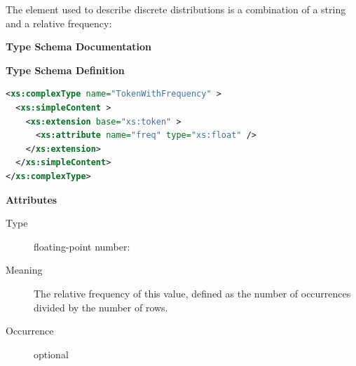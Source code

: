 \documentclass[11pt,a4paper]{ivoa}
\begin{document}
\begin{generated}
\begin{bigdescription}
\begin{description}
\end{description}


\end{bigdescription}\endgroup

\endgroup
\end{generated}


The  element used to describe discrete distributions is a
combination of a string and a relative frequency:

\begin{generated}
\begingroup
        \renewcommand*\descriptionlabel[1]{%
        \hbox to 5.5em{\emph{#1}\hfil}}\vspace{2ex}\noindent\textbf{ Type Schema Documentation}



\vspace{1ex}\noindent\textbf{ Type Schema Definition}

\begin{lstlisting}[language=XML,basicstyle=\footnotesize]
<xs:complexType name="TokenWithFrequency" >
  <xs:simpleContent >
    <xs:extension base="xs:token" >
      <xs:attribute name="freq" type="xs:float" />
    </xs:extension>
  </xs:simpleContent>
</xs:complexType>
\end{lstlisting}

\vspace{0.5ex}\noindent\textbf{ Attributes}

\begingroup\small\begin{bigdescription}
\item[freq]
\begin{description}
\item[Type] floating-point number: 
\item[Meaning] The relative frequency of this value, defined as
                  the number of occurrences divided by the number
                  of rows.
\item[Occurrence] optional
\end{description}



\end{bigdescription}
\end{generated}
\end{document}

